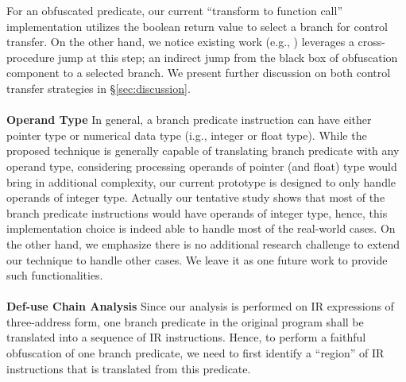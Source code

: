 For an obfuscated predicate, our current ``transform to function call''
implementation utilizes the boolean return value to select a branch for control
transfer. On the other hand, we notice existing work (e.g., \cite{Ma, Maieee})
leverages a cross-procedure jump at this step; an indirect jump from the black
box of obfuscation component to a selected branch. We present further discussion on
both control transfer strategies in \S\ref{sec:discussion}.
\\\\
\noindent \textbf{Operand Type} In general, a branch predicate instruction can
have either pointer type or numerical data type (i.g., integer or float type).
While the proposed technique is generally capable of translating branch
predicate with any operand type, considering processing operands of pointer (and
float) type would bring in additional complexity, our current prototype is
designed to only handle operands of integer type. Actually our tentative study
shows that most of the branch predicate instructions would have operands of
integer type, hence, this implementation choice is indeed able to handle most of
the real-world cases. On the other hand, we emphasize there is no additional
research challenge to extend our technique to handle other cases. We leave it as
one future work to provide such functionalities.
\\\\
\noindent \textbf{Def-use Chain Analysis} Since our analysis is performed on IR
expressions of three-address form, one branch predicate in the original program
shall be translated into a sequence of IR instructions. Hence, to perform a
faithful obfuscation of one branch predicate, we need to first identify a
``region'' of IR instructions that is translated from this predicate.


